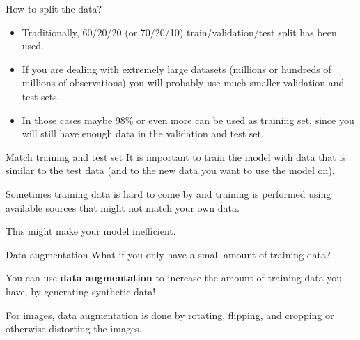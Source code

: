 \documentclass[9pt, aspectratio=169]{beamer}
\begin{document}
\begin{frame}
    {How to split the data?}
    \begin{itemize}
        \item Traditionally, 60/20/20 (or 70/20/10) train/validation/test split has been used.
        \item If you are dealing with extremely large datasets (millions or hundreds of millions of observations) you will probably use much smaller validation and test sets.
        \item In those cases maybe 98\% or even more can be used as training set, since you will still have enough data in the validation and test set.
    \end{itemize}
\end{frame}

\begin{frame}
    {Match training and test set}
    It is important to train the model with data that is similar to the test data (and to the new data you want to use the model on).

    Sometimes training data is hard to come by and training is performed using available sources that might not match your own data.

    This might make your model inefficient.
\end{frame}

\begin{frame}
    {Data augmentation}
    What if you only have a small amount of training data?

    You can use \textbf{data augmentation} to increase the amount of training data you have, by generating synthetic data!

    For images, data augmentation is done by rotating, flipping, and cropping or otherwise distorting the images.
\end{frame}
\end{document}
